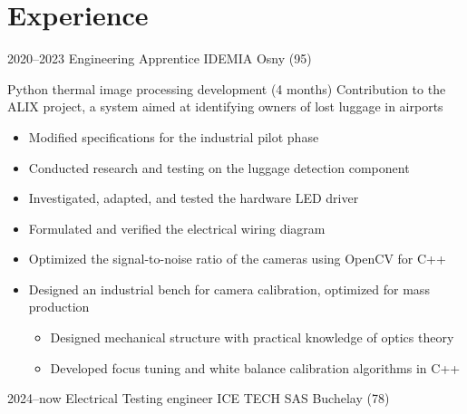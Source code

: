 \documentclass[11pt,a4paper]{moderncv}
\begin{document}
\section{Experience}
\cventry
    {2020--2023}
    {Engineering Apprentice}
    {IDEMIA}
    {Osny (95)}
    {}
    {
    Python thermal image processing development (4 months) \newline
    Contribution to the ALIX project, a system aimed at identifying owners of lost luggage in airports
    \begin{itemize}
        \setlength{\itemindent}{1cm}
        \item Modified specifications for the industrial pilot phase
        \item Conducted research and testing on the luggage detection component
        \item Investigated, adapted, and tested the hardware LED driver
        \item Formulated and verified the electrical wiring diagram
        \item Optimized the signal-to-noise ratio of the cameras using OpenCV for C++
        \item Designed an industrial bench for camera calibration, optimized for mass production
        \begin{itemize}
            \setlength{\itemindent}{1.5cm}
            \item Designed mechanical structure with practical knowledge of optics theory
            \item Developed focus tuning and white balance calibration algorithms in C++
        \end{itemize}
    \end{itemize}
    }
\cventry
    {2024--now}
    {Electrical Testing engineer}
    {ICE TECH SAS}
    {Buchelay (78)}
    {}
\end{document}
